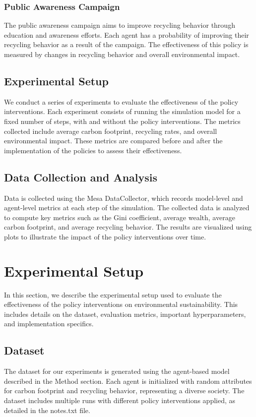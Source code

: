 \documentclass{article} %
\begin{document}
\subsubsection{Public Awareness Campaign}
The public awareness campaign aims to improve recycling behavior through education and awareness efforts. Each agent has a probability of improving their recycling behavior as a result of the campaign. The effectiveness of this policy is measured by changes in recycling behavior and overall environmental impact.

\subsection{Experimental Setup}
We conduct a series of experiments to evaluate the effectiveness of the policy interventions. Each experiment consists of running the simulation model for a fixed number of steps, with and without the policy interventions. The metrics collected include average carbon footprint, recycling rates, and overall environmental impact. These metrics are compared before and after the implementation of the policies to assess their effectiveness.

\subsection{Data Collection and Analysis}
Data is collected using the Mesa DataCollector, which records model-level and agent-level metrics at each step of the simulation. The collected data is analyzed to compute key metrics such as the Gini coefficient, average wealth, average carbon footprint, and average recycling behavior. The results are visualized using plots to illustrate the impact of the policy interventions over time.

\section{Experimental Setup}
\label{sec:experimental}

In this section, we describe the experimental setup used to evaluate the effectiveness of the policy interventions on environmental sustainability. This includes details on the dataset, evaluation metrics, important hyperparameters, and implementation specifics.

\subsection{Dataset}
The dataset for our experiments is generated using the agent-based model described in the Method section. Each agent is initialized with random attributes for carbon footprint and recycling behavior, representing a diverse society. The dataset includes multiple runs with different policy interventions applied, as detailed in the notes.txt file.
\end{document}
